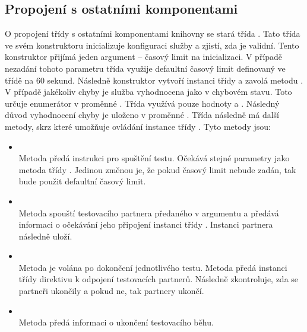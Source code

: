 \subsection{Propojení s ostatními komponentami}

O propojení třídy  s ostatními komponentami knihovny se stará třída .
Tato třída ve svém konstruktoru inicializuje konfiguraci služby a zjistí, zda je validní. Tento konstruktor přijímá jeden argument -- časový limit na inicializaci. V případě nezadání tohoto parametru třída využije defaultní časový limit definovaný ve třídě na 60 sekund. Následně konstruktor vytvoří instanci třídy  a zavolá metodu . V případě jakékoliv chyby je služba vyhodnocena jako v chybovém stavu. Toto určuje enumerátor  v proměnné . Třída využívá pouze hodnoty  a . Následný důvod vyhodnocení chyby je uloženo v proměnné . Třída následně má další metody, skrz které umožňuje ovládání instance třídy . Tyto metody jsou:

\begin{itemize}
    \item {} \\ Metoda předá instrukci pro spuštění testu. Očekává stejné parametry jako metoda  třídy . Jedinou změnou je, že pokud časový limit nebude zadán, tak bude použit defaultní časový limit.
    \item {} \\ Metoda spouští testovacího partnera předaného v argumentu a předává informaci o očekávání jeho připojení  instanci třídy . Instanci partnera následně uloží.
    \item {} \\ Metoda je volána po dokončení jednotlivého testu. Metoda předá instanci třídy  direktivu k odpojení testovacích partnerů. Následně zkontroluje, zda se partneři ukončily a pokud ne, tak partnery ukončí.
    \item {} \\ Metoda předá informaci o ukončení testovacího běhu.
\end{itemize}

